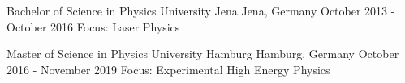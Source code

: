 
\begin{cventries}
  \cventry
    {Bachelor of Science in Physics} %
    {University Jena} %
    {Jena, Germany} %
    {October 2013 - October 2016} %
    {Focus: Laser Physics}
\end{cventries}


\begin{cventries}
  \cventry
    {Master of Science in Physics} %
    {University Hamburg} %
    {Hamburg, Germany} %
    {October 2016 - November 2019} %
    {Focus: Experimental High Energy Physics}
\end{cventries}